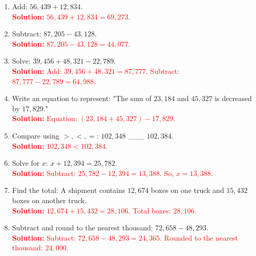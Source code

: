 \documentclass[12pt]{article}
\begin{document}
\begin{tcolorbox}[colframe=black!60, colback=white, 
coltitle=black, colbacktitle=black!15, fonttitle=\bfseries\Large, 
title=Exercises, halign title=center, left=10pt, right=10pt, top=10pt, bottom=60pt]
\begin{enumerate}[itemsep=3em]
    \item Add: \( 56,439 + 12,834 \).\\
    \textcolor{red}{\textbf{Solution:} \( 56,439 + 12,834 = 69,273 \).}

    \item Subtract: \( 87,205 - 43,128 \).\\
    \textcolor{red}{\textbf{Solution:} \( 87,205 - 43,128 = 44,077 \).}

    \item Solve: \( 39,456 + 48,321 - 22,789 \).\\
    \textcolor{red}{\textbf{Solution:} Add: \( 39,456 + 48,321 = 87,777 \). Subtract: \( 87,777 - 22,789 = 64,988 \).}

    \item Write an equation to represent: "The sum of \( 23,184 \) and \( 45,327 \) is decreased by \( 17,829 \)."\\
    \textcolor{red}{\textbf{Solution:} Equation: \( (23,184 + 45,327) - 17,829 \).}

    \item Compare using \( >, <, = \): \( 102,348 \) \_\_\_ \( 102,384 \).\\
    \textcolor{red}{\textbf{Solution:} \( 102,348 < 102,384 \).}

    \item Solve for \( x \): \( x + 12,394 = 25,782 \).\\
    \textcolor{red}{\textbf{Solution:} Subtract: \( 25,782 - 12,394 = 13,388 \). So, \( x = 13,388 \).}

    \item Find the total: A shipment contains \( 12,674 \) boxes on one truck and \( 15,432 \) boxes on another truck.\\
    \textcolor{red}{\textbf{Solution:} \( 12,674 + 15,432 = 28,106 \). Total boxes: \( 28,106 \).}

    \item Subtract and round to the nearest thousand: \( 72,658 - 48,293 \).\\
    \textcolor{red}{\textbf{Solution:} Subtract: \( 72,658 - 48,293 = 24,365 \). Rounded to the nearest thousand: \( 24,000 \).}
\end{enumerate}
\end{tcolorbox}
\end{document}
